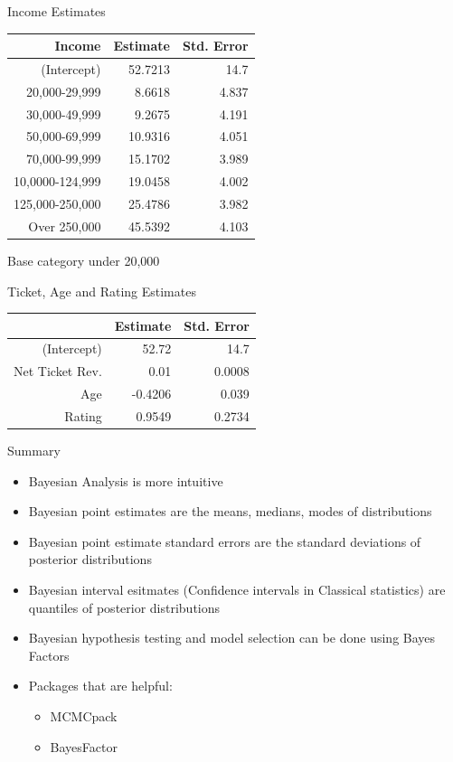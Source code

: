 \documentclass[table]{beamer}
\begin{document}
\begin{frame}{Income Estimates}
	\begin{table}
		\centering
		\begin{tabular}{r|rr}
			Income & Estimate & Std. Error \\
			\hline
		      (Intercept) & 52.7213 & 14.7  \\			 
			20,000-29,999 & 8.6618 & 4.837 \\
			30,000-49,999 & 9.2675 & 4.191 \\
			50,000-69,999 & 10.9316 & 4.051 \\
			70,000-99,999 & 15.1702 & 3.989 \\
			10,0000-124,999 & 19.0458 & 4.002 \\
			125,000-250,000 & 25.4786 & 3.982 \\
			Over 250,000 & 45.5392 & 4.103 \\
		\end{tabular}
	\end{table}
	Base category under 20,000
\end{frame}

\begin{frame}{Ticket, Age and Rating Estimates}
\begin{table}
	\begin{tabular}{r|rr}
		            & Estimate & Std. Error \\
		            \hline 
		(Intercept) & 52.72 & 14.7 \\
		Net Ticket Rev. & 0.01 & 0.0008 \\
		Age & -0.4206 & 0.039 \\
		Rating & 0.9549 & 0.2734 \\
	\end{tabular}
\end{table}
	
	
\end{frame}

\begin{frame}{Summary}
	\begin{itemize}
		\item Bayesian Analysis is more intuitive
		\item Bayesian point estimates are the means, medians, modes of distributions
		\item Bayesian point estimate standard errors are the standard deviations of posterior distributions
		\item Bayesian interval esitmates (Confidence intervals in Classical statistics) are quantiles of posterior distributions
		\item Bayesian hypothesis testing and model selection can be done using Bayes Factors
		\item Packages that are helpful:
		\begin{itemize}
			\item MCMCpack
			\item BayesFactor
		\end{itemize}
	\end{itemize}
\end{frame}
\end{document}
